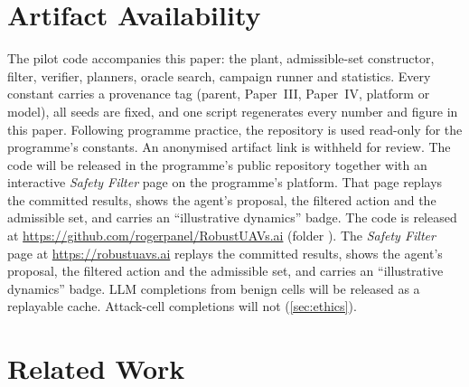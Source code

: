 \section{Artifact Availability}\label{sec:artifact}
The pilot code accompanies this paper: the plant, admissible-set
constructor, filter, verifier, planners, oracle search, campaign runner and
statistics. Every constant carries a provenance tag (parent, Paper~III,
Paper~IV, platform or model), all seeds are fixed, and one script
regenerates every number and figure in this paper. Following programme
practice, the repository is used read-only for the programme's constants.
\ifanonymous
An anonymised artifact link is withheld for review. The code will be
released in the programme's public repository together with an interactive
\emph{Safety Filter} page on the programme's platform. That page replays the
committed results, shows the agent's proposal, the filtered action and the
admissible set, and carries an ``illustrative dynamics'' badge.
\else
The code is released at \url{https://github.com/rogerpanel/RobustUAVs.ai}
(folder ). The \emph{Safety Filter} page at
\url{https://robustuavs.ai} replays the committed results, shows the agent's
proposal, the filtered action and the admissible set, and carries an
``illustrative dynamics'' badge.
\fi
LLM completions from benign cells will be released as a replayable cache.
Attack-cell completions will not (\cref{sec:ethics}).

\section{Related Work}\label{sec:related}
